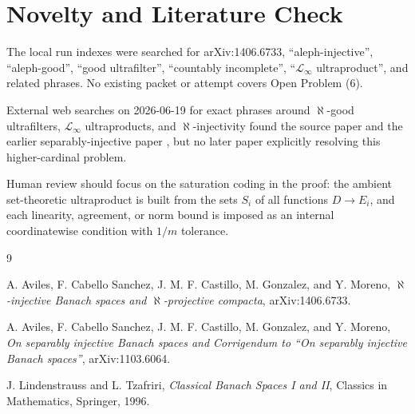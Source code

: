 \documentclass[11pt]{article}
\begin{document}
\section*{Novelty and Literature Check}

The local run indexes were searched for arXiv:1406.6733, ``aleph-injective'',
``aleph-good'', ``good ultrafilter'', ``countably incomplete'',
``\(\mathcal L_\infty\) ultraproduct'', and related phrases.  No existing
packet or attempt covers Open Problem (6).

External web searches on 2026-06-19 for exact phrases around
\(\aleph\)-good ultrafilters, \(\mathcal L_\infty\) ultraproducts, and
\(\aleph\)-injectivity found the source paper \cite{ACCGM} and the earlier
separably-injective paper \cite{ACCGMsep}, but no later paper explicitly
resolving this higher-cardinal problem.

Human review should focus on the saturation coding in the proof: the ambient
set-theoretic ultraproduct is built from the sets \(S_i\) of all functions
\(D\to E_i\), and each linearity, agreement, or norm bound is imposed as an
internal coordinatewise condition with \(1/m\) tolerance.

\begin{thebibliography}{9}

A. Aviles, F. Cabello Sanchez, J. M. F. Castillo, M. Gonzalez, and Y. Moreno,
\emph{\(\aleph\)-injective Banach spaces and \(\aleph\)-projective compacta},
arXiv:1406.6733.

A. Aviles, F. Cabello Sanchez, J. M. F. Castillo, M. Gonzalez, and Y. Moreno,
\emph{On separably injective Banach spaces and Corrigendum to ``On separably
injective Banach spaces''},
arXiv:1103.6064.

J. Lindenstrauss and L. Tzafriri,
\emph{Classical Banach Spaces I and II},
Classics in Mathematics, Springer, 1996.

\end{thebibliography}
\end{document}
